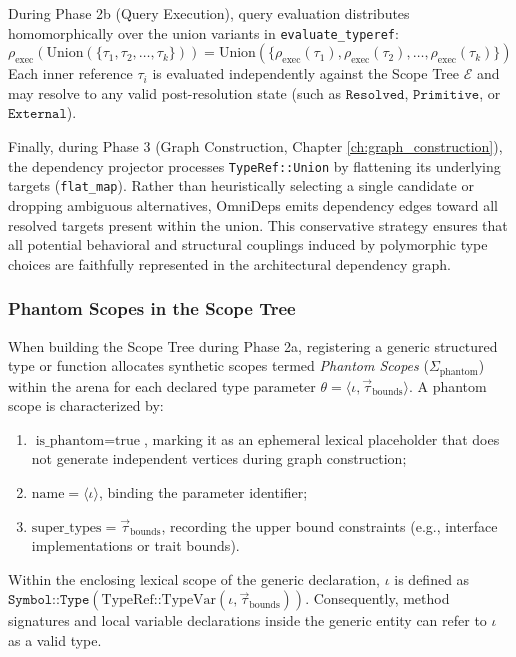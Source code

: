 During Phase 2b (Query Execution), query evaluation distributes homomorphically
over the union variants in \texttt{evaluate\_typeref}:
$$\rho_{\text{exec}}(\text{Union}(\{ \tau_1, \tau_2, \ldots, \tau_k \})) =
\text{Union}(\{ \rho_{\text{exec}}(\tau_1),
\rho_{\text{exec}}(\tau_2), \ldots, \rho_{\text{exec}}(\tau_k) \})$$
Each inner reference $\tau_i$ is evaluated independently against the Scope Tree
$\mathcal{E}$ and may resolve to any valid post-resolution state (such as
$\texttt{Resolved}$, $\texttt{Primitive}$, or $\texttt{External}$).

Finally, during Phase 3 (Graph Construction, Chapter
\ref{ch:graph_construction}),
the dependency projector processes \texttt{TypeRef::Union} by flattening its
underlying targets (\texttt{flat\_}\-\texttt{map}). Rather than
heuristically selecting a
single candidate or dropping ambiguous alternatives, OmniDeps emits dependency
edges toward all resolved targets present within the union. This conservative
strategy ensures that all potential behavioral and structural couplings induced
by polymorphic type choices are faithfully represented in the architectural
dependency graph.

\subsubsection{Phantom Scopes in the Scope Tree}

When building the Scope Tree during Phase 2a, registering a generic structured
type or function allocates synthetic scopes termed \textit{Phantom Scopes}
($\Sigma_{\text{phantom}}$) within the arena for each declared type parameter
$\theta = \langle \iota, \vec{\tau}_{\text{bounds}} \rangle$. A phantom scope
is characterized by:
\begin{enumerate}
  \item $\text{is\_phantom} = \text{true}$, marking it as an ephemeral lexical
    placeholder that does not generate independent vertices during
    graph construction;
  \item $\text{name} = \langle \iota \rangle$, binding the parameter identifier;
  \item $\text{super\_types} = \vec{\tau}_{\text{bounds}}$, recording the upper
    bound constraints (e.g., interface implementations or trait bounds).
\end{enumerate}

Within the enclosing lexical scope of the generic declaration, $\iota$ is
defined as $\texttt{Symbol::Type}(\text{TypeRef::TypeVar}(\iota,
\vec{\tau}_{\text{bounds}}))$.
Consequently, method signatures and local variable declarations inside the
generic entity can refer to $\iota$ as a valid type.

